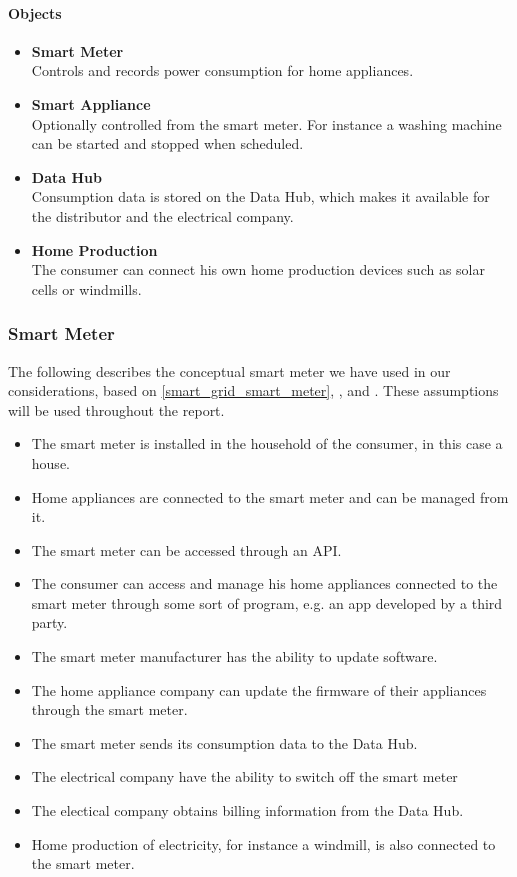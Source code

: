 \paragraph{Objects}
\begin{itemize}
\item \textbf{Smart Meter}\\ Controls and records power consumption for home appliances.
\item \textbf{Smart Appliance}\\ Optionally controlled from the smart meter.
For instance a washing machine can be started and stopped when scheduled.
\item \textbf{Data Hub}\\ Consumption data is stored on the Data Hub, which makes it available for the distributor and the electrical company.
\item \textbf{Home Production}\\ The consumer can connect his own home production devices such as solar cells or windmills.
\end{itemize}

\subsubsection{Smart Meter}
The following describes the conceptual smart meter we have used in our considerations, based on \cref{smart_grid_smart_meter}, \citet{tdlm}, and \citet{smart_meter_survey}.
These assumptions will be used throughout the report.
\begin{itemize}
	\item The smart meter is installed in the household of the consumer, in this case a house.
	\item Home appliances are connected to the smart meter and can be managed from it.
	\item The smart meter can be accessed through an API.
	\item The consumer can access and manage his home appliances connected to the smart meter through some sort of program, e.g. an app developed by a third party.
	\item The smart meter manufacturer has the ability to update software. 
	\item The home appliance company can update the firmware of their appliances through the smart meter.
	\item The smart meter sends its consumption data to the Data Hub.
	\item The electrical company have the ability to switch off the smart meter 
	\item The electical company obtains billing information from the Data Hub.
	\item Home production of electricity, for instance a windmill, is also connected to the smart meter.
\end{itemize}

